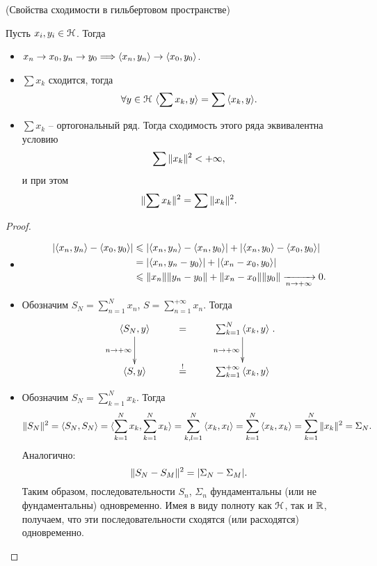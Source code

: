 \begin{theorem}(Свойства сходимости в гильбертовом пространстве) 

    Пусть $x_i, y_i \in \mathcal{H}$. Тогда
    \begin{itemize}
        \item $x_n \to x_0, y_n \to y_0 \Longrightarrow \langle x_n, y_n \rangle \to \langle x_0, y_0 \rangle$.
        \item $\sum{x_k}$ сходится, тогда
            \[
                \forall y \in \mathcal{H}~ \langle \sum{x_k}, y \rangle = \sum{\langle x_k, y \rangle}
            .\]
        \item $\sum{x_k}$ -- ортогональный ряд. Тогда сходимость этого ряда
            эквивалентна условию
            \[
                \sum{\lVert x_k\rVert^2} < +\infty
            ,\]
            и при этом
            \[
                \lVert\sum{x_k}\rVert^2 = \sum{\lVert x_k\rVert^2}
            .\]
    \end{itemize}
\end{theorem}
\begin{proof}
    \enewline
    \begin{itemize}
        \item 
            \begin{align*}
                |\langle x_n, y_n \rangle - \langle x_0, y_0 \rangle| 
                &\leqslant |\langle x_n, y_n \rangle - \langle x_n, y_0 \rangle| + 
                |\langle x_n, y_0 \rangle - \langle x_0, y_0 \rangle| \\
                &= |\langle x_n, y_n - y_0 \rangle| + |\langle x_n - x_0, y_0 \rangle| \\
                &\leqslant \lVert x_n\rVert \lVert y_n - y_0\rVert + \lVert x_n - x_0\rVert \lVert y_0\rVert
                \xrightarrow[n \to +\infty]{} 0
            .\end{align*}
        \item Обозначим $S_N = \sum_{n = 1}^N{x_n}$, $S = \sum_{n = 1}^{+\infty}{x_n}$.
            Тогда
            \[
                \xymatrix{
                    \scp{S_N}{y} \ar[d]_{n \to +\infty} & = & \sum_{k = 1}^N
                                                        {\scp{x_k}{y}} \ar[d]_{n \to +\infty} \\
                    \scp{S}{y} & \overset{!}{=} & \sum_{k = 1}^{+\infty}{\scp{x_k}{y}}
                }
            .\]
        \item Обозначим $S_N = \sum_{k = 1}^N{x_k}$. Тогда
            \begin{align*}
                \lVert S_N\rVert^2 = \langle S_N, S_N \rangle = \langle \sum_{k = 1}^N{x_k}, \sum_{k = 1}^N{x_k} \rangle =
                \sum_{k, l = 1}^N{\langle x_k, x_l \rangle} = \sum_{k = 1}^N{\langle x_k, x_k \rangle} = 
                \sum_{k = 1}^N{\lVert x_k\rVert^2} = \Sigma_N
            .\end{align*}
            Аналогично:
            \[
                \lVert S_N - S_M\rVert^2 = |\Sigma_N - \Sigma_M|
            .\]
            Таким образом, последовательности $S_n$, $\Sigma_n$ фундаментальны
            (или не фундаментальны) одновременно. Имея в виду полноту как $\mathcal{H}$,
            так и $\mathbb{R}$, получаем, что эти последовательности сходятся (или
            расходятся) одновременно.
    \end{itemize}
\end{proof}

